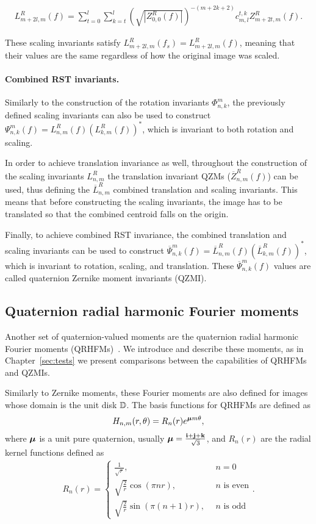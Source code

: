 \begin{gather*}
    L_{m + 2l,m}^R(f) = \sum_{t=0}^l\sum_{k=t}^l\left(\sqrt{|Z_{0,0}^R(f)|}\right)^{-(m+2k+2)}c_{m,l}^{t,k}Z_{m+2t,m}^R(f).
\end{gather*}

These scaling invariants satisfy $L_{m + 2l,m}^R(f_s) = L_{m + 2l,m}^R(f)$, meaning that their values are the same regardless of how the original image was scaled.


\paragraph{Combined RST invariants.}
Similarly to the construction of the rotation invariants $\Phi_{n,k}^m$, the previously defined scaling invariants can also be used to construct $\Psi_{n,k}^m(f) = L_{n,m}^R(f)(L_{k,m}^R(f))^*$, which is invariant to both rotation and scaling.


In order to achieve translation invariance as well, throughout the construction of the scaling invariants $L_{n,m}^R$ the translation invariant QZMs ($\overline{Z}_{n,m}^R(f)$) can be used, thus defining the $\overline{L}_{n,m}^R$ combined translation and scaling invariants. This means that before constructing the scaling invariants, the image has to be translated so that the combined centroid falls on the origin.


Finally, to achieve combined RST invariance, the combined translation and scaling invariants can be used to construct $\overline{\Psi}_{n,k}^m(f) = \overline{L}_{n,m}^R(f)(\overline{L}_{k,m}^R(f))^*$, which is invariant to rotation, scaling, and translation. These $\overline{\Psi}_{n,k}^m(f)$ values are called quaternion Zernike moment invariants (QZMI).


\subsection{Quaternion radial harmonic Fourier moments}
Another set of quaternion-valued moments are the quaternion radial harmonic Fourier moments (QRHFMs)~\cite{Wang, WangAcc, LiuAcc}. We introduce and describe these moments, as in Chapter~\ref{sec:tests} we present comparisons between the capabilities of QRHFMs and QZMIs.


Similarly to Zernike moments, these Fourier moments are also defined for images whose domain is the unit disk $\mathbb{D}$. The basis functions for QRHFMs are defined as
\begin{gather*}
    H_{n,m}(r,\theta) = R_n(r)e^{\boldsymbol{\mu} m \theta},
\end{gather*}
where $\boldsymbol{\mu}$ is a unit pure quaternion, usually $\boldsymbol{\mu} = \frac{\mathbf{i} + \mathbf{j} + \mathbf{k}}{\sqrt{3}}$, and $R_n(r)$ are the radial kernel functions defined as
\begin{gather*}
    R_n(r) = \begin{cases}
        \frac{1}{\sqrt{r}}, &n = 0\\
        \sqrt{\frac{2}{r}}\cos(\pi n r), &n \text{ is even}\\
        \sqrt{\frac{2}{r}}\sin(\pi (n+1) r), \ \ &n \text{ is odd}
    \end{cases}.
\end{gather*}

